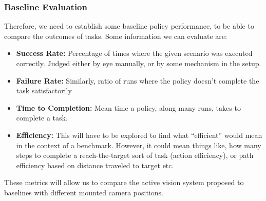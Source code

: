 \subsubsection{Baseline Evaluation}
Therefore, we need to establish some baseline policy performance, to be able to compare the outcomes of tasks. Some information we can evaluate are:
\begin{itemize}
  \item \textbf{Success Rate:} Percentage of times where the given scenario was executed correctly. Judged either by eye manually, or by some mechanism in the setup.
  \item \textbf{Failure Rate:} Similarly, ratio of runs where the policy doesn't complete the task satisfactorily
  \item \textbf{Time to Completion:} Mean time a policy, along many runs, takes to complete a task. 
  \item \textbf{Efficiency:} This will have to be explored to find what ``efficient'' would mean in the context of a benchmark. However, it could mean things like, how many steps to complete a reach-the-target sort of task (action efficiency), or path efficiency based on distance traveled to target etc.
\end{itemize}
These metrics will allow us to compare the active vision system proposed to baselines with different mounted camera positions.

